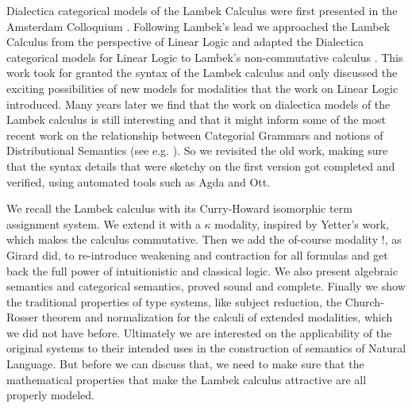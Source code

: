 \documentclass[bsl,meeting]{asl}
\def\urladdr#1{\endgraf\noindent{\it URL Address}: {\tt #1}.}
\newcommand{\NP}{}
\begin{document}
\thispagestyle{empty}


\NP  
{}
%


  Dialectica categorical models of the Lambek Calculus were first presented in the Amsterdam Colloquium \cite{depaiva1991}. Following Lambek's lead we approached the Lambek Calculus from the perspective of Linear Logic and adapted the Dialectica categorical models for Linear Logic to Lambek's non-commutative calculus \cite{lambek1988}. This  work took for granted the syntax of the Lambek calculus
and only discussed the exciting possibilities of new models for modalities that the work on Linear Logic 
introduced. Many years later we find that the work on dialectica models of the Lambek calculus is still interesting and that it might inform some of the most recent work on the relationship between Categorial Grammars and notions of Distributional Semantics (see e.g. \cite{coecke2013}). 
So we revisited the old work, making sure that the syntax details that were sketchy on the first version got completed and verified, using automated tools such as Agda and Ott.



We recall the Lambek calculus with its Curry-Howard isomorphic term assignment system. We extend it with a $\kappa$ modality, inspired by Yetter's work, which makes the calculus commutative. Then we add the of-course modality $!$,  as Girard did, to  re-introduce weakening and contraction for all formulas and get back the full power of intuitionistic and classical logic. We also present algebraic semantics and categorical semantics, proved sound and complete. Finally we show the traditional properties of type systems, like subject reduction, the Church-Rosser theorem  and  normalization for the calculi of extended modalities, which we did not have before. 
Ultimately we are  interested on the applicability  of the original systems to their intended uses in the construction of semantics of Natural Language. But before we can discuss that, we need to make sure that the mathematical properties that make the Lambek calculus attractive are all properly modeled. 
\end{document}
